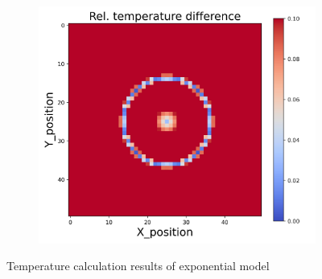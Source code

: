 \begin{figure}[h]
\begin{minipage}{\textwidth}
\begin{subfigure}{0.3\textwidth}
        \end{subfigure}
        \begin{subfigure}{0.3\textwidth}
            \centering
            \includegraphics[width=\textwidth]{figures/raw_data/33/exp/T_bias.jpg}
        \end{subfigure}
    \end{minipage}
    \caption{Temperature calculation results of exponential model}  
\end{figure}
